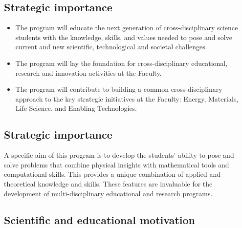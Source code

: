 \documentclass[%
oneside,                 %
final,                   %
10pt]{article}
\begin{document}
\subsection{Strategic importance}
\begin{block}{}
\begin{itemize}
\item The program will educate the next generation of cross-disciplinary science students with the knowledge, skills, and values needed to pose and solve current and new scientific, technological and societal challenges. 

\item The program will lay the foundation for cross-disciplinary educational, research and innovation activities at the Faculty. 

\item The program will contribute to building a common cross-disciplinary approach to the key strategic initiatives at the Faculty: Energy, Materials, Life Science, and Enabling Technologies.
\end{itemize}

\noindent
\end{block}

\subsection{Strategic importance}
\begin{block}{}
A specific aim of this program is to develop the students' ability to pose and
solve problems that combine physical insights with mathematical tools
and computational skills. This provides a unique combination
of applied and theoretical knowledge and skills. These features are invaluable
for the development of multi-disciplinary educational and research programs.
\end{block}

\subsection{Scientific and educational motivation}
\end{document}
